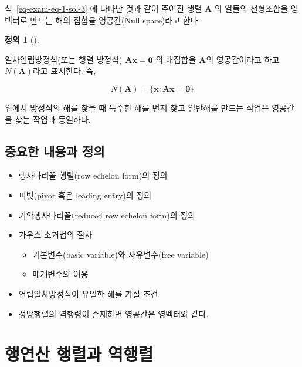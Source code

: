 \documentclass[
  11pt,
  a4paper,
  oneside]{scrbook}
\providecommand{\tightlist}{%
  \setlength{\itemsep}{0pt}\setlength{\parskip}{0pt}}\usepackage{longtable,booktabs,array}
\theoremstyle{definition}
\newtheorem{definition}{정의}[chapter]
\theoremstyle{definition}
\theoremstyle{plain}
\theoremstyle{remark}
\begin{document}
식~\ref{eq-exam-eq-1-sol-3} 에 나타난 것과 같이 주어진 행렬 \(\pmb A\)
의 열들의 선형조합을 영벡터로 만드는 해의 집합을 영공간(Null space)라고
한다.

\begin{definition}[]\protect\hypertarget{def-nullspace}{}\label{def-nullspace}

일차연립방정식(또는 행렬 방정식) \(\pmb A \pmb x = \pmb 0\) 의 해집합을
\(\pmb A\)의 영공간이라고 하고 \(N (\pmb A)\)라고 표시한다. 즉,

\[ N( \pmb A)=\{ \pmb x: \pmb A \pmb x= \pmb 0 \}\]

\end{definition}

위에서 방정식의 해를 찾을 때 특수한 해를 먼저 찾고 일반해를 만드는
작업은 영공간을 찾는 작업과 동일하다.

\section{중요한 내용과
정의}\label{uxc911uxc694uxd55c-uxb0b4uxc6a9uxacfc-uxc815uxc758-3}

\begin{itemize}
\tightlist
\item
  행사다리꼴 행렬(row echelon form)의 정의
\item
  피벗(pivot 혹은 leading entry)의 정의
\item
  기약행사다리꼴(reduced row echelon form)의 정의
\item
  가우스 소거법의 절차

  \begin{itemize}
  \tightlist
  \item
    기본변수(basic variable)와 자유변수(free variable)
  \item
    매개변수의 이용
  \end{itemize}
\item
  연립일차방정식이 유일한 해를 가질 조건
\item
  정방행렬의 역행령이 존재하면 영공간은 영벡터와 같다.
\end{itemize}


\chapter{행연산 행렬과 역행렬}\label{matrix_inverse2}
\end{document}

